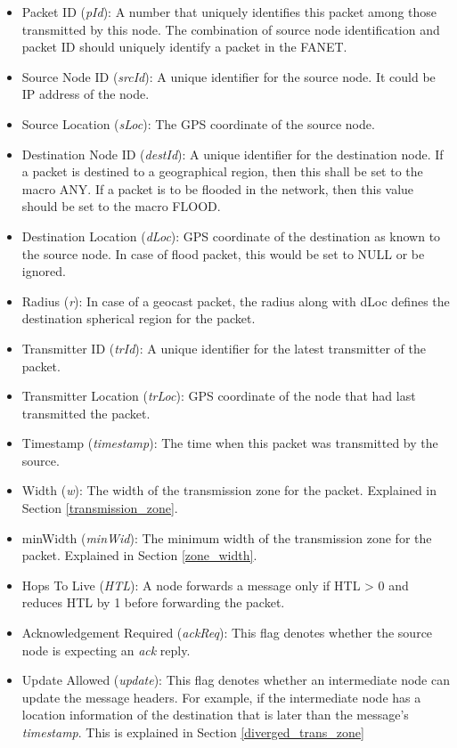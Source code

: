 \begin{itemize}
\item Packet ID (\emph{pId}): A number that uniquely identifies this packet among those transmitted by this node. The combination of source node identification and packet ID should uniquely identify a packet in the FANET. 
\item Source Node ID (\emph{srcId}): A unique identifier for the source node. It could be IP address of the node.
\item Source Location (\emph{sLoc}): The GPS coordinate of the source node.
\item Destination Node ID (\emph{destId}): A unique identifier for the destination node. If a packet is destined to a geographical region, then this shall be set to the macro ANY. If a packet is to be flooded in the network, then this value should be set to the macro FLOOD. 
\item Destination Location (\emph{dLoc}): GPS coordinate of the destination as known to the source node. In case of flood packet, this would be set to NULL or be ignored. 
\item Radius (\emph{r}): In case of a geocast packet, the radius along with dLoc defines the destination spherical region for the packet.
\item Transmitter ID (\emph{trId}): A unique identifier for the latest transmitter of the packet.
\item Transmitter Location (\emph{trLoc}): GPS coordinate of the node that had last transmitted the packet.
\item Timestamp (\emph{timestamp}): The time when this packet was transmitted by the source.
\item Width (\emph{w}): The width of the transmission zone for the packet. Explained in Section \ref{transmission_zone}.
\item minWidth (\emph{minWid}): The minimum width of the transmission zone for the packet. Explained in Section \ref{zone_width}.
\item Hops To Live (\emph{HTL}): A node forwards a message only if HTL > 0 and reduces HTL by 1 before forwarding the packet. 
\item Acknowledgement Required (\emph{ackReq}): This flag denotes whether the source node is expecting an \emph{ack} reply.
\item Update Allowed (\emph{update}): This flag denotes whether an intermediate node can update the message headers. For example, if the intermediate node has a location information of the destination that is later than the message's \emph{timestamp}. This is explained in Section \ref{diverged_trans_zone}

\end{itemize}


